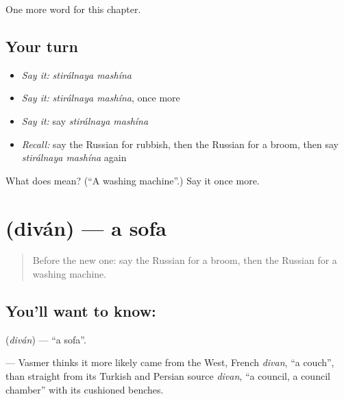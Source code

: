 \begin{grammarlens}[title={What you've built}]
One more word for this chapter.
\end{grammarlens}

\subsection*{Your turn}
\begin{itemize}
\raggedright
  \item \emph{Say it:} \emph{stirálnaya mashína}
  \item \emph{Say it:} \emph{stirálnaya mashína}, once more
  \item \emph{Say it:} say \emph{stirálnaya mashína}
  \item \emph{Recall:} say the Russian for rubbish, then the Russian for a broom, then say \emph{stirálnaya mashína} again
\end{itemize}

\begin{tcolorbox}[breakable,colback=teal!4,colframe=teal!35!black,title={Before you move on}]
What does   mean? (\textquotedblleft{}A washing machine\textquotedblright{}.) Say it once more.
\end{tcolorbox}
\section[\texorpdfstring{\ru{диван} (diván)}{диван (diván)}]{ (diván) — a sofa}

\label{lesson:RU-C97-sofa}



\begin{quote}
Before the new one: say the Russian for a broom, then the Russian for a washing machine.
\end{quote}

\subsection*{You'll want to know: }
\textbf{} (\emph{diván}) — \textquotedblleft{}a sofa\textquotedblright{}.

\begin{cousinweb}
\textbf{} — Vasmer thinks it more likely came from the West, French \emph{divan}, \textquotedblleft{}a couch\textquotedblright{}, than straight from its Turkish and Persian source \emph{divan}, \textquotedblleft{}a council, a council chamber\textquotedblright{} with its cushioned benches.
\end{cousinweb}

